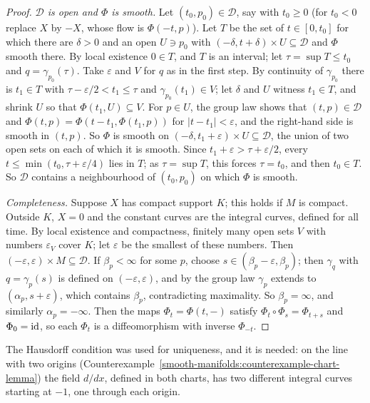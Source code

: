 \begin{proof}
\emph{$\mathcal{D}$ is open and $\Phi$ is smooth.} Let $(t_0, p_0) \in \mathcal{D}$, say with $t_0 \geq 0$ (for $t_0 < 0$ replace $X$ by $-X$, whose flow is
$\Phi(-t, p)$). Let $T$ be the set of $t \in [0, t_0]$ for which there are $\delta > 0$ and an open $U \ni p_0$ with $(-\delta, t + \delta) \times U \subseteq
\mathcal{D}$ and $\Phi$ smooth there. By local existence $0 \in T$, and $T$ is an interval; let $\tau = \sup T \leq t_0$ and $q = \gamma_{p_0}(\tau)$. Take
$\varepsilon$ and $V$ for $q$ as in the first step. By continuity of $\gamma_{p_0}$ there is $t_1 \in T$ with $\tau - \varepsilon/2 < t_1 \leq \tau$ and
$\gamma_{p_0}(t_1) \in V$; let $\delta$ and $U$ witness $t_1 \in T$, and shrink $U$ so that $\Phi(t_1, U) \subseteq V$. For $p \in U$, the group law shows that
$(t, p) \in \mathcal{D}$ and $\Phi(t, p) = \Phi(t - t_1, \Phi(t_1, p))$ for $|t - t_1| < \varepsilon$, and the right-hand side is smooth in $(t, p)$. So $\Phi$
is smooth on $(-\delta, t_1 + \varepsilon) \times U \subseteq \mathcal{D}$, the union of two open sets on each of which it is smooth. Since
$t_1 + \varepsilon > \tau + \varepsilon/2$, every $t \leq \min(t_0, \tau + \varepsilon/4)$ lies in $T$; as $\tau = \sup T$, this forces $\tau = t_0$, and then
$t_0 \in T$. So $\mathcal{D}$ contains a neighbourhood of $(t_0, p_0)$ on which $\Phi$ is smooth.

\emph{Completeness.} Suppose $X$ has compact support $K$; this holds if $M$ is compact. Outside $K$, $X = 0$ and the constant curves are the integral curves,
defined for all time. By local existence and compactness, finitely many open sets $V$ with numbers $\varepsilon_V$ cover $K$; let $\varepsilon$ be the smallest of
these numbers. Then $(-\varepsilon, \varepsilon) \times M \subseteq \mathcal{D}$. If $\beta_p < \infty$ for some $p$, choose $s \in (\beta_p - \varepsilon,
\beta_p)$; then $\gamma_q$ with $q = \gamma_p(s)$ is defined on $(-\varepsilon, \varepsilon)$, and by the group law $\gamma_p$ extends to $(\alpha_p, s + \varepsilon)$, which contains
$\beta_p$, contradicting maximality. So $\beta_p = \infty$, and similarly $\alpha_p = -\infty$. Then the maps $\Phi_t = \Phi(t, -)$ satisfy
$\Phi_t \circ \Phi_s = \Phi_{t+s}$ and $\Phi_0 = \mathrm{id}$, so each $\Phi_t$ is a diffeomorphism with inverse $\Phi_{-t}$.
\end{proof}

\begin{remark}\label{smooth-manifolds:remark-hausdorff-flows}
The Hausdorff condition was used for uniqueness, and it is needed: on the line with two origins (Counterexample~\ref{smooth-manifolds:counterexample-chart-lemma})
the field $d/dx$, defined in both charts, has two different integral curves starting at $-1$, one through each origin.
\end{remark}

